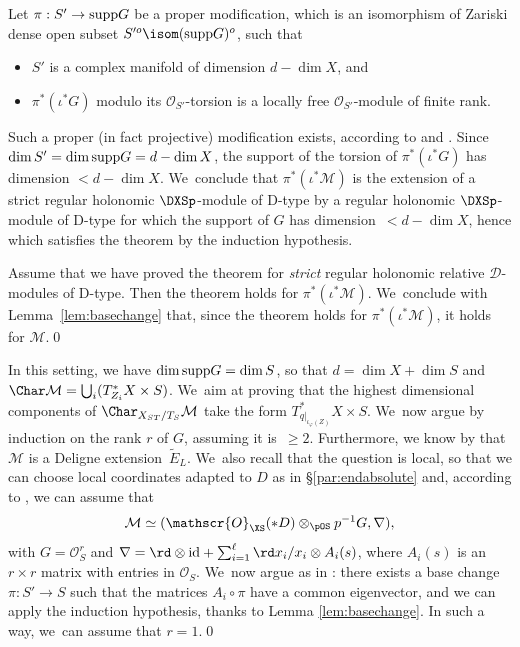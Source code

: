 \documentclass{amsart}
\theoremstyle{plain}
\numberwithin{theorem}{section}
\theoremstyle{definition}
\theoremstyle{remark}
\theoremstyle{definition}
\newcommand{\wt}{\widetilde}
\newcommand{\cD}{\mathcal{D}}
\newcommand{\cM}{\mathcal{M}}
\newcommand{\cO}{\mathscr{O}}
\newcommand{\id}{\textup{id}}
\newcommand{\supp}{\textup{supp}}
\begin{document}
Let $\pi:S'\to \supp G$ be a proper modification, which is an isomorphism of Zariski dense open subset $S^{\prime o}\isom (\supp G)^o$, such that
\begin{itemize}
\item
$S'$ is a complex manifold of dimension $d-\dim X$, and
\item
$\pi^*(\iota^*G)$ modulo its $\cO_{S'}$-torsion is a locally free $\cO_{S'}$-module of finite rank.
\end{itemize}
Such a proper (in fact projective) modification exists, according to \cite[Th.\,6]{A-H-V18} and \hbox{\cite[Th.\,3.5]{Rossi68}}. Since $\dim S'=\dim \supp G=d-\dim X$, the support of the torsion of $\pi^*(\iota^*G)$ has dimension $<d-\dim X$. We~conclude that $\pi^*(\iota^*\cM)$ is the extension of a strict regular holonomic $\DXSp$-module of D-type by a regular holonomic $\DXSp$-module of D-type for which the support of $G$ has dimension~$<d-\dim X$, hence which satisfies the theorem by the induction hypothesis.

Assume that we have proved the theorem for \emph{strict} regular holonomic relative $\cD$-modules of D-type. Then the theorem holds for $\pi^*(\iota^*\cM)$. We~conclude with Lemma~\ref{lem:basechange} that, since the theorem holds for $\pi^*(\iota^*\cM)$, it holds for $\cM$.\qed

In this setting, we have $\dim\supp G=\dim S$, so that $d=\dim X+\dim S$ and $\Char\cM=\bigcup_i(T^*_{Z_i}X\times S)$. We~aim at proving that the highest dimensional components of $\Char_{X_{ST}/T_S}\cM$ take the form $T^*_{q|_{\iota_\varphi(Z)}}X\times S$. We~now argue by induction on the rank $r$ of $G$, assuming it is~\hbox{$\geq2$}. Furthermore, we know by \cite[Prop.\,4.25(i)]{FFS23} that $\cM$ is a Deligne extension~$\wt E_L$. We~also recall that the question is local, so that we can choose local coordinates adapted to $D$ as in \S\ref{par:endabsolute} and, according to \cite[Proof of Th.\,4.15(i)]{FFS23}, we can assume that
\[
\cM\simeq(\cO_{\XS}(*D)\otimes_{\pOS}p^{-1}G,\nabla),
\]
with $G=\cO_S^r$ and $\nabla=\rd\otimes\id+\sum_{i=1}^\ell\rd x_i/x_i\otimes A_i(s)$, where $A_i(s)$ is an $r\times r$ matrix with entries in $\cO_S$. We~now argue as in \cite[Step 4 of the proof of Th\,4.15(iii)]{FFS23}: there exists a base change $\pi:S'\to S$ such that the matrices $A_i\circ\pi$ have a common eigenvector, and we can apply the induction hypothesis, thanks to Lemma \ref{lem:basechange}. In such a way, we~can assume that $r=1$.\qed
\end{document}

